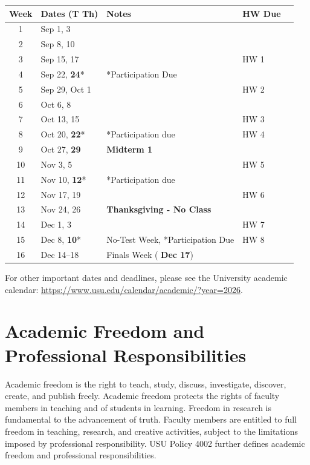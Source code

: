 \documentclass[11pt]{article}\usepackage[]{graphicx}\usepackage[]{xcolor}
\begin{document}
\begin{longtable}{|c|l|l|l|l}
\hline
\textbf{Week} & \textbf{Dates (T Th)} & \textbf{Notes} & \textbf{HW Due}\\
\hline
\endhead

1 & Sep 1, 3 & &  \\ \hline
2 & Sep 8, 10 & & \\ \hline
3 & Sep 15, 17 & & HW 1  \\ \hline
4 & Sep 22, \textbf{24}* & *Participation Due & \\ \hline
5 & Sep 29, Oct 1 & & HW 2 \\ \hline
6 & Oct 6, 8 & &  \\ \hline
7 & Oct 13, 15 & & HW 3  \\ \hline
8 & Oct 20, \textbf{22}* & *Participation due & HW 4 \\ \hline
9 & Oct 27, {\color{blue} \textbf{29}} & {\color{blue} \textbf{Midterm 1}} & \\ \hline
10 & Nov 3, 5 & & HW 5\\ \hline
11 & Nov 10, \textbf{12}* & *Participation due &  \\ \hline
12 & Nov 17, 19 & & HW 6  \\ \hline
13 & Nov 24, {\color{red} 26} & {\color{red} \textbf{Thanksgiving - No Class}} & \\ \hline
14 & Dec 1, 3 & & HW 7 \\ \hline
15 & Dec 8, \textbf{10}* & No-Test Week, *Participation Due & HW 8 \\ \hline
16 & Dec 14--18 & {Finals Week {(\color{blue} \textbf{Dec 17})}} &  \\ \hline
\end{longtable}

For other important dates and deadlines, please see the University academic calendar: \url{https://www.usu.edu/calendar/academic/?year=2026}.

\section{Academic Freedom and Professional Responsibilities}

Academic freedom is the right to teach, study, discuss, investigate, discover, create, and publish freely. 
Academic freedom protects the rights of faculty members in teaching and of students in learning.
Freedom in research is fundamental to the advancement of truth. 
Faculty members are entitled to full freedom in teaching, research, and creative activities, subject to the limitations imposed by professional responsibility. 
USU Policy 4002 further defines academic freedom and professional responsibilities.
\end{document}
